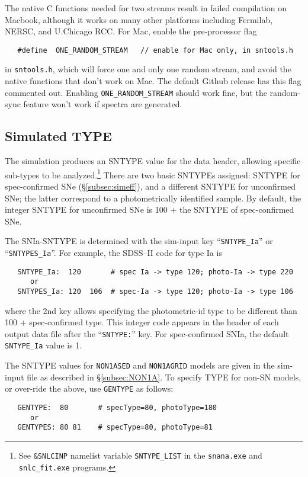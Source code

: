 \documentclass[12pt]{article}
\begin{document}
{The native C functions needed for two streams result in 
failed compilation on Macbook, although it works on many
other platforms including Fermilab, NERSC, and U.Chicago RCC.
For Mac, enable the pre-processor flag
\begin{verbatim}
   #define  ONE_RANDOM_STREAM   // enable for Mac only, in sntools.h
\end{verbatim}
in {\tt sntools.h}, which will force one and only one random
stream, and avoid the native functions that don't work on Mac.
The default Github release has this flag commented out. 
Enabling {\tt ONE\_RANDOM\_STREAM} should work fine, 
but the random-sync feature won't work if spectra are generated.

  \clearpage
  \subsection{Simulated TYPE}
  \label{subsec:sim_sntype}


The simulation produces an SNTYPE value for the data header,
allowing specific sub-types to be analyzed.\footnote{See
{\tt \&SNLCINP} namelist variable {\tt SNTYPE\_LIST}
in the {\tt snana.exe} and {\tt snlc\_fit.exe} programs.}
There are two basic SNTYPEs assigned: 
SNTYPE for spec-confirmed SNe (\S\ref{subsec:simeff}),
and a different SNTYPE for unconfirmed SNe;
the latter correspond to a photometrically identified sample.
By default, the integer SNTYPE for unconfirmed SNe 
is 100 + the SNTYPE of spec-confirmed SNe. 



The SNIa-SNTYPE is determined with the sim-input key 
``{\tt SNTYPE\_Ia}'' or ``{\tt SNTYPES\_Ia}''. 
For example, the SDSS--II code for type Ia is
\begin{verbatim}
   SNTYPE_Ia:  120       # spec Ia -> type 120; photo-Ia -> type 220
      or
   SNTYPES_Ia: 120  106  # spec-Ia -> type 120; photo-Ia -> type 106
\end{verbatim}
where the 2nd key allows specifying the photometric-id type
to be different than 100 + spec-confirmed type.
This integer code appears in the header of each output 
data file after the ``{\tt SNTYPE:}'' key. 
For spec-confirmed SNIa, the default {\tt SNTYPE\_Ia} value is 1.


The SNTYPE values for {\tt NON1ASED} and {\tt NON1AGRID} models 
are given in the sim-input file as described in \S\ref{subsec:NON1A}.
To specify TYPE for non-SN models, or over-ride the above,
use {\tt GENTYPE} as follows:
\begin{verbatim}
   GENTYPE:  80       # specType=80, photoType=180
      or
   GENTYPES: 80 81    # specType=80, photoType=81
\end{verbatim}


}
\end{document}

